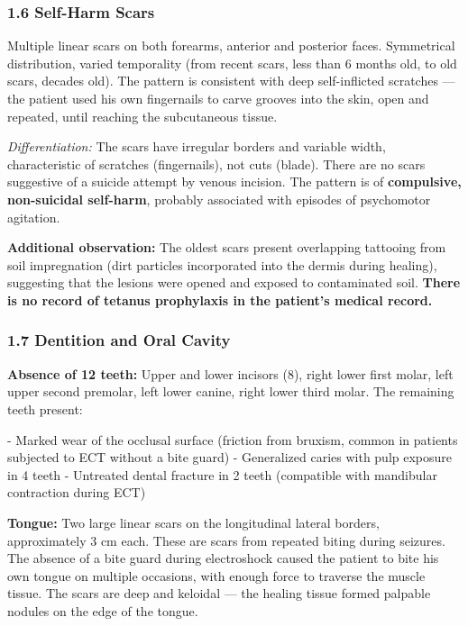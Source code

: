 \subsubsection*{1.6 Self-Harm Scars}

\noindent Multiple linear scars on both forearms, anterior and posterior faces. Symmetrical distribution, varied temporality (from recent scars, less than 6 months old, to old scars, decades old). The pattern is consistent with deep self-inflicted scratches --- the patient used his own fingernails to carve grooves into the skin, open and repeated, until reaching the subcutaneous tissue.

\noindent \textit{Differentiation:} The scars have irregular borders and variable width, characteristic of scratches (fingernails), not cuts (blade). There are no scars suggestive of a suicide attempt by venous incision. The pattern is of \textbf{compulsive, non-suicidal self-harm}, probably associated with episodes of psychomotor agitation.

\noindent \textbf{Additional observation:} The oldest scars present overlapping tattooing from soil impregnation (dirt particles incorporated into the dermis during healing), suggesting that the lesions were opened and exposed to contaminated soil. \textbf{There is no record of tetanus prophylaxis in the patient's medical record.}

\subsubsection*{1.7 Dentition and Oral Cavity}

\noindent \textbf{Absence of 12 teeth:} Upper and lower incisors (8), right lower first molar, left upper second premolar, left lower canine, right lower third molar. The remaining teeth present:

\noindent - Marked wear of the occlusal surface (friction from bruxism, common in patients subjected to ECT without a bite guard)
- Generalized caries with pulp exposure in 4 teeth
- Untreated dental fracture in 2 teeth (compatible with mandibular contraction during ECT)

\noindent \textbf{Tongue:} Two large linear scars on the longitudinal lateral borders, approximately 3 cm each. These are scars from repeated biting during seizures. The absence of a bite guard during electroshock caused the patient to bite his own tongue on multiple occasions, with enough force to traverse the muscle tissue. The scars are deep and keloidal --- the healing tissue formed palpable nodules on the edge of the tongue.

